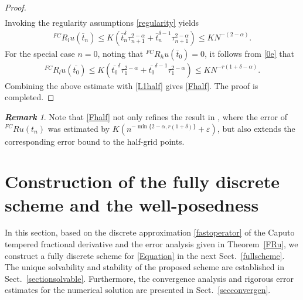 \documentclass[10pt, reqno]{amsart}
\theoremstyle{remark}
\newtheorem{rem}{\bf Remark}[section]
\theoremstyle{definition}
\numberwithin{table}{section}
\begin{document}
\begin{proof}
\begin{align}
\end{align}
Invoking the regularity assumptions \eqref{regularity} yields
\begin{align}
{}^{FC}R_lu(\bar{t}_n)
    \leq K(\bar{t}_n^\delta \tau_{n+1}^{2-\alpha} + \bar{t}_n^{\delta-1} \tau_{n+1}^{2-\alpha})
\leq KN^{-(2-\alpha)}.\label{0e}
\end{align}
For the special case $n=0$, noting that ${}^{FC}R_h u(\bar{t}_0) = 0$, it follows from \eqref{0e} that
    \begin{align}
    {}^{FC}R_lu(\bar{t_0})\leq K (\bar{t_0}^{\delta}\tau_{1}^{2-\alpha}+\bar{t_0}^{\delta-1}\tau_{1}^{2-\alpha})
    \leq KN^{-r(1+\delta-\alpha)}.
    \end{align}
Combining the above estimate with \eqref{L1half} gives \eqref{Fhalf}. The proof is completed.
\end{proof}
\begin{rem}
    Note that \eqref{Fhalf} not only refines the result in \cite{cao2023}, where the error of ${}^{FC}Ru(t_n)$ was estimated by
$K(n^{-\min\{2-\alpha, r(1+\delta)\}} + \varepsilon)$, but also extends the corresponding error bound to the half-grid points.
\end{rem}
\section{Construction of the fully discrete scheme and the well-posedness}\label{section3}
In this section, based on the discrete approximation \eqref{fastoperator} of the Caputo tempered fractional derivative and the error analysis given in Theorem~\ref{FRu}, we construct a fully discrete scheme for  \eqref{Equation} in the next Sect.~\ref{fullscheme}. The unique solvability and stability of the proposed scheme are established in Sect.~\ref{sectionsolvable}. Furthermore, the convergence analysis and rigorous error estimates for the numerical solution are presented in Sect.~\ref{secconvergen}.
\end{document}
